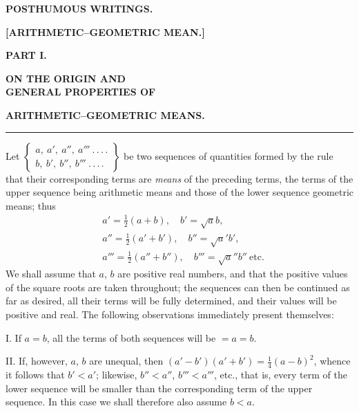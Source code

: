 \begingroup
\renewcommand{\arraystretch}{1.45}
\clearpage{}
\begin{center}
\textbf{POSTHUMOUS WRITINGS.}\par
\textbf{[ARITHMETIC–GEOMETRIC MEAN.]}\par
\textbf{PART I.}\par
\textbf{ON THE ORIGIN AND}\\\textbf{GENERAL PROPERTIES OF}\par
\textbf{ARITHMETIC–GEOMETRIC MEANS.}\par
\rule{0.09\linewidth}{0.4pt}\par
\end{center}
Let $\left\{\begin{array}{l}a,\allowbreak \ a',\allowbreak \ a'',\allowbreak \ a'''\ .\,\allowbreak .\,\allowbreak .\,\allowbreak .\\ b,\allowbreak \ b',\allowbreak \ b'',\allowbreak \ b'''\ .\,\allowbreak .\,\allowbreak .\,\allowbreak .\end{array}\right\}$ be two sequences of quantities formed by the rule that
their corresponding terms are \textit{means} of the preceding terms,
the terms of the upper sequence being arithmetic means and those of the lower sequence geometric means; thus
\[
\begin{aligned}&a'=\tfrac12(a+b),\quad b'=\surd ab,\\[6pt]&a''=\tfrac12(a'+b'),\quad b''=\surd a'b',\\[6pt]&a'''=\tfrac12(a''+b''),\quad b'''=\surd a''b''\ \mathrm{etc.}\end{aligned}
\]
We shall assume that $a$, $b$ are positive real numbers, and that the positive values
of the square roots are taken throughout; the sequences can then be continued
as far as desired, all their terms will be fully determined, and their values will be positive and real. The following observations immediately present themselves:
\par
I. If $a=b$, all the terms of both sequences will be $=a=b$.
\par
II. If, however, $a$, $b$ are unequal, then $(a'-b')(a'+b')=\tfrac14(a-b)^2$, whence
it follows that $b'<a'$; likewise, $b''<a''$, $b'''<a'''$, etc., that is, every term of the lower sequence will be smaller than the corresponding term of the upper sequence. In this case
we shall therefore also assume $b<a$.
